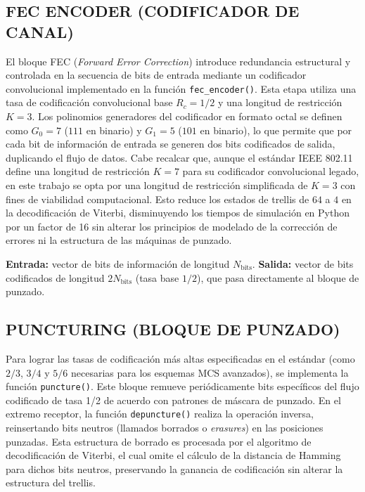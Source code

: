\subsection{FEC ENCODER (CODIFICADOR DE CANAL)}
El bloque FEC (\textit{Forward Error Correction}) introduce redundancia estructural y controlada en la secuencia de bits de entrada mediante un codificador convolucional implementado en la función \texttt{fec\_encoder()}. Esta etapa utiliza una tasa de codificación convolucional base $R_c = 1/2$ y una longitud de restricción $K = 3$. Los polinomios generadores del codificador en formato octal se definen como $G_0 = 7$ ($111$ en binario) y $G_1 = 5$ ($101$ en binario), lo que permite que por cada bit de información de entrada se generen dos bits codificados de salida, duplicando el flujo de datos. Cabe recalcar que, aunque el estándar IEEE 802.11 define una longitud de restricción $K=7$ para su codificador convolucional legado, en este trabajo se opta por una longitud de restricción simplificada de $K=3$ con fines de viabilidad computacional. Esto reduce los estados de trellis de $64$ a $4$ en la decodificación de Viterbi, disminuyendo los tiempos de simulación en Python por un factor de 16 sin alterar los principios de modelado de la corrección de errores ni la estructura de las máquinas de punzado.

\textbf{Entrada:} vector de bits de información de longitud $N_{\text{bits}}$. \textbf{Salida:} vector de bits codificados de longitud $2 N_{\text{bits}}$ (tasa base $1/2$), que pasa directamente al bloque de punzado.

\subsection{PUNCTURING (BLOQUE DE PUNZADO)}
Para lograr las tasas de codificación más altas especificadas en el estándar (como $2/3$, $3/4$ y $5/6$ necesarias para los esquemas MCS avanzados), se implementa la función \texttt{puncture()}. Este bloque remueve periódicamente bits específicos del flujo codificado de tasa 1/2 de acuerdo con patrones de máscara de punzado. En el extremo receptor, la función \texttt{depuncture()} realiza la operación inversa, reinsertando bits neutros (llamados borrados o \textit{erasures}) en las posiciones punzadas. Esta estructura de borrado es procesada por el algoritmo de decodificación de Viterbi, el cual omite el cálculo de la distancia de Hamming para dichos bits neutros, preservando la ganancia de codificación sin alterar la estructura del trellis.

